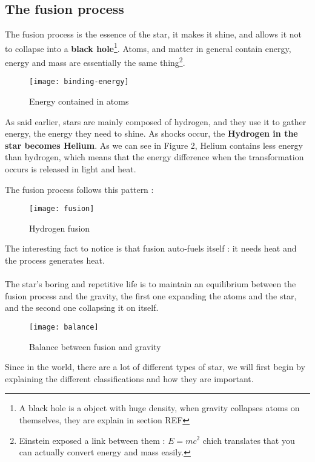 \documentclass[a4paper, 11pt]{article} %
\begin{document}
\subsection{The fusion process}
The fusion process is the essence of the star, it makes it shine, and allows it not to collapse into a \textbf{black hole}\footnote{A black hole is a object with huge density, when gravity collapses atoms on themselves, they are explain in section REF}. Atoms, and matter in general contain energy, energy and mass are essentially the same thing\footnote{Einstein exposed a link between them : $E = mc^2$ chich translates that you can actually convert energy and mass easily.}. 


\begin{figure}[h]
\centering
\texttt{[image: binding-energy]}
\caption{Energy contained in atoms}
\end{figure}

As said earlier, stars are mainly composed of hydrogen, and they use it to gather energy, the energy they need to shine. As shocks occur, the \textbf{Hydrogen in the star becomes Helium}. As we can see in Figure 2, Helium contains less energy than hydrogen, which means that the energy difference when the transformation occurs is released in light and heat.

The fusion process follows this pattern :
\begin{figure}[h]
\centering
\texttt{[image: fusion]}
\caption{Hydrogen fusion}
\end{figure}

The interesting fact to notice is that fusion auto-fuels itself : it needs heat and the process generates heat.
\paragraph*{}
The star's boring and repetitive life is to maintain an equilibrium between the fusion process and the gravity, the first one expanding the atoms and the star, and the second one collapsing it on itself.

\begin{figure}[h]
\centering
\texttt{[image: balance]}
\caption{Balance between fusion and gravity}
\end{figure}

Since in the world, there are a lot of different types of star, we will first begin by explaining the different classifications and how they are important.
\end{document}
